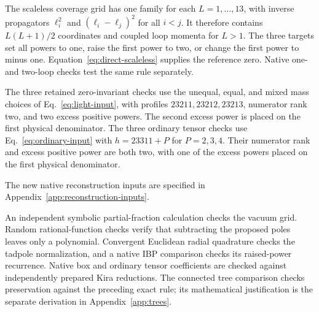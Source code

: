 The scaleless coverage grid has one family for each $L=1,\ldots,13$, with inverse propagators $\ell_i^2$ and $(\ell_i-\ell_j)^2$ for all $i<j$. It therefore contains $L(L+1)/2$ coordinates and coupled loop momenta for $L>1$. The three targets set all powers to one, raise the first power to two, or change the first power to minus one. Equation~\eqref{eq:direct-scaleless} supplies the reference zero. Native one- and two-loop checks test the same rule separately.

The three retained zero-invariant checks use the unequal, equal, and mixed mass choices of Eq.~\eqref{eq:light-input}, with profiles $23211,23212,23213$, numerator rank two, and two excess positive powers. The second excess power is placed on the first physical denominator. The three ordinary tensor checks use Eq.~\eqref{eq:ordinary-input} with $h=23311+P$ for $P=2,3,4$. Their numerator rank and excess positive power are both two, with one of the excess powers placed on the first physical denominator.

The new native reconstruction inputs are specified in Appendix~\ref{app:reconstruction-inputs}.

An independent symbolic partial-fraction calculation checks the vacuum grid. Random rational-function checks verify that subtracting the proposed poles leaves only a polynomial. Convergent Euclidean radial quadrature checks the tadpole normalization, and a native IBP comparison checks its raised-power recurrence. Native box and ordinary tensor coefficients are checked against independently prepared Kira reductions. The connected tree comparison checks preservation against the preceding exact rule; its mathematical justification is the separate derivation in Appendix~\ref{app:trees}.
